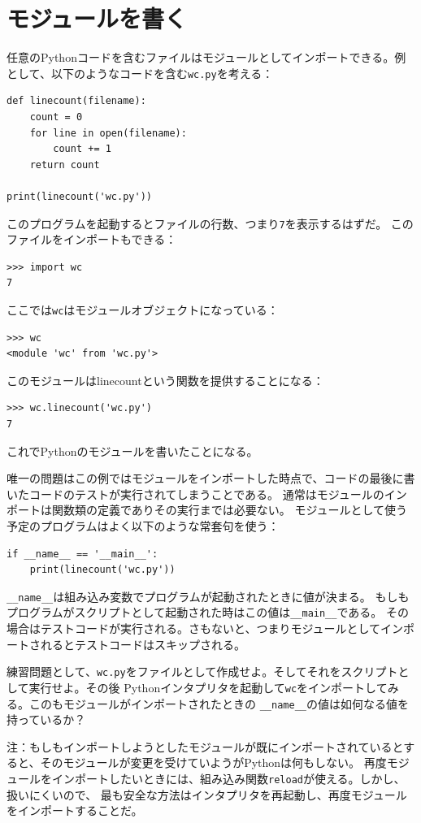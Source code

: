 \documentclass[a4j,12pt,makeidx]{jbook}
\begin{document}
\section{モジュールを書く}
任意のPythonコードを含むファイルはモジュールとしてインポートできる。例として、以下のようなコードを含む{\tt wc.py}を考える：
\begin{verbatim}
def linecount(filename):
    count = 0
    for line in open(filename):
        count += 1
    return count

print(linecount('wc.py'))
\end{verbatim} 
このプログラムを起動するとファイルの行数、つまり{\tt 7}を表示するはずだ。
このファイルをインポートもできる：
\begin{verbatim}
>>> import wc
7
\end{verbatim} 
ここでは{\tt wc}はモジュールオブジェクトになっている：
\begin{verbatim}
>>> wc
<module 'wc' from 'wc.py'>
\end{verbatim}
このモジュールはlinecountという関数を提供することになる：
\begin{verbatim}
>>> wc.linecount('wc.py')
7
\end{verbatim} 
これでPythonのモジュールを書いたことになる。\par
唯一の問題はこの例ではモジュールをインポートした時点で、コードの最後に書いたコードのテストが実行されてしまうことである。
通常はモジュールのインポートは関数類の定義でありその実行までは必要ない。
モジュールとして使う予定のプログラムはよく以下のような常套句を使う：
\begin{verbatim}
if __name__ == '__main__':
    print(linecount('wc.py'))
\end{verbatim}    
{\verb"__name__"}は組み込み変数でプログラムが起動されたときに値が決まる。
もしもプログラムがスクリプトとして起動された時はこの値は{\verb"__main__"}である。
その場合はテストコードが実行される。さもないと、つまりモジュールとしてインポートされるとテストコードはスキップされる。\par
練習問題として、{\tt wc.py}をファイルとして作成せよ。そしてそれをスクリプトとして実行せよ。その後
Pythonインタプリタを起動して{\tt wc}をインポートしてみる。このもモジュールがインポートされたときの
{\verb"__name__"}の値は如何なる値を持っているか？\par
注：もしもインポートしようとしたモジュールが既にインポートされているとすると、そのモジュールが変更を受けていようがPythonは何もしない。
再度モジュールをインポートしたいときには、組み込み関数{\tt reload}が使える。しかし、扱いにくいので、
最も安全な方法はインタプリタを再起動し、再度モジュールをインポートすることだ。
%
\end{document}
